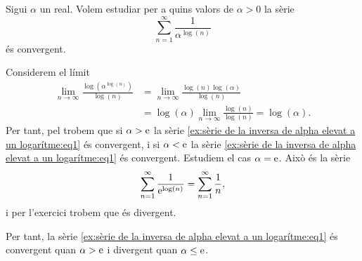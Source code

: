 \documentclass[../../Main.tex]{subfiles}
\begin{document}
	\begin{example}
		\label{ex:sèrie de la inversa de alpha elevat a un logarítme}
		Sigui \(\alpha\) un real. Volem estudiar per a quins valors de \(\alpha>0\) la sèrie
		\begin{equation}
			\label{ex:sèrie de la inversa de alpha elevat a un logarítme:eq1}
			\sum_{n=1}^{\infty}\frac{1}{\alpha^{\log(n)}}
		\end{equation}
		és convergent.
		\begin{solution}
			Considerem el límit
			\begin{align*}
				\lim_{n\to\infty}\frac{\log\left(\alpha^{\log(n)}\right)}{\log(n)}&=\lim_{n\to\infty}\frac{\log(n)\log(\alpha)}{\log(n)} \\
				&=\log(\alpha)\lim_{n\to\infty}\frac{\log(n)}{\log(n)}=\log(\alpha).
			\end{align*}
			Per tant, pel  trobem que si \(\alpha>\mathrm{e}\) la sèrie \eqref{ex:sèrie de la inversa de alpha elevat a un logarítme:eq1} és convergent, i si \(\alpha<\mathrm{e}\) la sèrie \eqref{ex:sèrie de la inversa de alpha elevat a un logarítme:eq1} és convergent. Estudiem el cas \(\alpha=\mathrm{e}\). Això és la sèrie
			\[\sum_{n=1}^{\infty}\frac{1}{\mathrm{e}^{\log(n)}}=\sum_{n=1}^{\infty}\frac{1}{n},\]
			i per l'exercici  trobem que és divergent.
			
			Per tant, la sèrie \eqref{ex:sèrie de la inversa de alpha elevat a un logarítme:eq1} és convergent quan \(\alpha>\mathrm{e}\) i divergent quan \(\alpha\leq\mathrm{e}\).
		\end{solution}
	\end{example}
\end{document}
